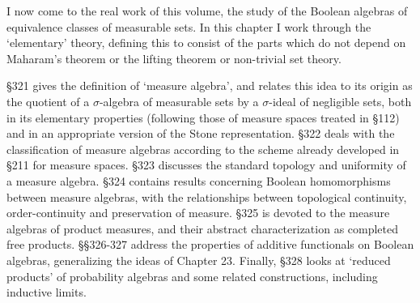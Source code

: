  
\def\chaptername{Measure algebras} 
\def\sectionname{Introduction} 
 
 
I now come to the real work of this volume, the study of the Boolean 
algebras of equivalence classes of measurable sets.   In this chapter I 
work through the `elementary' theory, defining this to consist of the 
parts which do not depend on Maharam's theorem or the lifting theorem or 
non-trivial set theory. 
 
\S321 gives the definition of `measure algebra', and relates this idea 
to its origin as the quotient of a $\sigma$-algebra of measurable sets 
by a $\sigma$-ideal of negligible sets, both in its elementary 
properties (following those of measure spaces treated in \S112) and in 
an appropriate version of the Stone representation. 
\S322 deals with the classification of measure algebras according to the 
scheme already developed in \S211 for measure spaces.   \S323 discusses 
the standard topology and uniformity of a measure algebra.   \S324 
contains results 
concerning Boolean homomorphisms between measure algebras, with the 
relationships between topological continuity, order-continuity and 
preservation of measure.   \S325 is devoted to the measure algebras of 
product measures, and their abstract characterization as completed free
products.    
\S\S326-327 address the properties of additive functionals on Boolean 
algebras, generalizing the ideas of Chapter 23.   Finally, \S328 looks at 
`reduced products' of probability algebras and some related constructions, 
including inductive limits. 
 
\discrpage 
 
 
